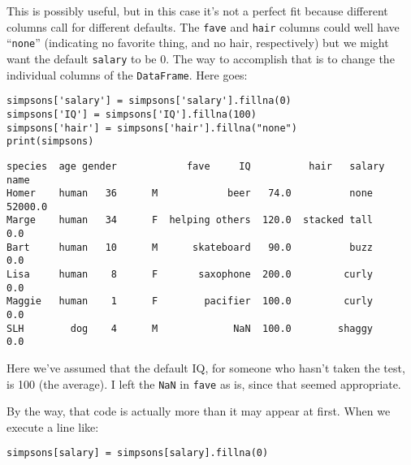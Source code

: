 This is possibly useful, but in this case it's not a perfect fit because
different columns call for different defaults. The \texttt{fave} and
\texttt{hair} columns could well have ``\texttt{none}'' (indicating no
favorite thing, and no hair, respectively) but we might want the default
\texttt{salary} to be 0. The way to accomplish that is to change the individual
columns of the \texttt{DataFrame}. Here goes:

\begin{Verbatim}[fontsize=\small,samepage=true,frame=single,framesep=3mm]
simpsons['salary'] = simpsons['salary'].fillna(0)
simpsons['IQ'] = simpsons['IQ'].fillna(100)
simpsons['hair'] = simpsons['hair'].fillna("none")
print(simpsons)
\end{Verbatim}
\vspace{-.2in}

\label{finalSimpsons}

\begin{Verbatim}[fontsize=\scriptsize,samepage=true,frame=leftline,framesep=5mm,framerule=1mm]
       species  age gender            fave     IQ          hair   salary
name                                                                    
Homer    human   36      M            beer   74.0          none  52000.0
Marge    human   34      F  helping others  120.0  stacked tall      0.0
Bart     human   10      M      skateboard   90.0          buzz      0.0
Lisa     human    8      F       saxophone  200.0         curly      0.0
Maggie   human    1      F        pacifier  100.0         curly      0.0
SLH        dog    4      M             NaN  100.0        shaggy      0.0
\end{Verbatim}

Here we've assumed that the default IQ, for someone who hasn't taken the test,
is 100 (the average). I left the \texttt{NaN} in \texttt{fave} as is, since
that seemed appropriate.

\begin{samepage}
By the way, that code is actually more than it may appear at first. When we
execute a line like:

\vspace{-.1in}
\begin{center}
\texttt{simpsons[\textquotesingle salary\textquotesingle] =
simpsons[\textquotesingle salary\textquotesingle].fillna(0)}
\end{center}
\vspace{-.1in}
\end{samepage}

